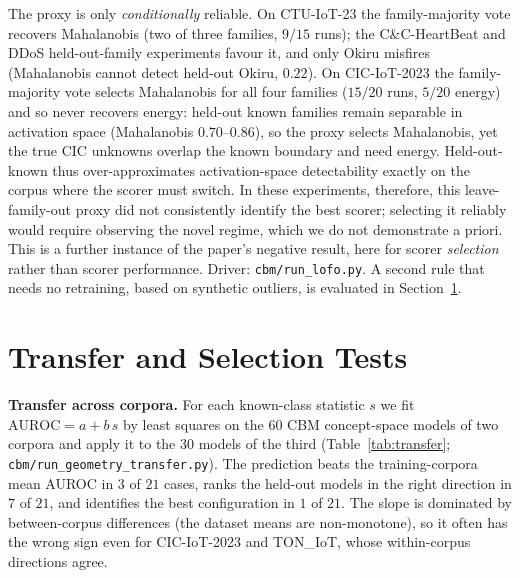 \documentclass[journal]{IEEEtran}
\begin{document}
The proxy is only \emph{conditionally} reliable. On CTU-IoT-23 the family-majority vote
recovers Mahalanobis (two of three families, $9/15$ runs); the C\&C-HeartBeat and DDoS
held-out-family experiments favour it, and only Okiru misfires (Mahalanobis cannot detect held-out Okiru,
$0.22$). On CIC-IoT-2023 the family-majority vote selects Mahalanobis for all four families
($15/20$ runs, $5/20$ energy) and so never recovers energy: held-out known families
remain separable in activation space (Mahalanobis $0.70$--$0.86$), so the proxy selects
Mahalanobis, yet the true CIC unknowns overlap the known boundary and need energy. Held-out-known thus
over-approximates activation-space detectability exactly on the corpus where the scorer
must switch. In these experiments, therefore, this leave-family-out proxy did not
consistently identify the best scorer; selecting it reliably
would require observing the novel regime, which we do not demonstrate a priori. This is a
further instance of the paper's negative result, here for scorer \emph{selection} rather
than scorer performance. Driver: \texttt{cbm/run\_lofo.py}. A second rule that needs no
retraining, based on synthetic outliers, is evaluated in Section~\ref{sec:transfer}.

\section{Transfer and Selection Tests}
\label{sec:transfer}

\textbf{Transfer across corpora.} For each known-class statistic $s$ we fit
$\mathrm{AUROC}=a+b\,s$ by least squares on the 60 CBM concept-space models of two corpora and apply
it to the 30 models of the third (Table~\ref{tab:transfer}; \texttt{cbm/run\_geometry\_transfer.py}).
The prediction beats the training-corpora mean AUROC in $3$ of $21$ cases, ranks the held-out models
in the right direction in $7$ of $21$, and identifies the best configuration in $1$ of $21$. The
slope is dominated by between-corpus differences (the dataset means are non-monotone), so it often
has the wrong sign even for CIC-IoT-2023 and TON\_IoT, whose within-corpus directions agree.
\end{document}
